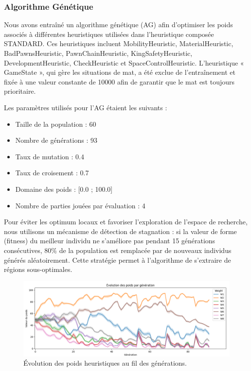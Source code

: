 \documentclass{article}
\begin{document}
\subsubsection{Algorithme Génétique}

Nous avons entraîné un algorithme génétique (AG) afin d'optimiser les poids associés à différentes heuristiques utilisées dans l'heuristique composée STANDARD. Ces heuristiques incluent MobilityHeuristic, MaterialHeuristic, BadPawnsHeuristic, PawnChainHeuristic, KingSafetyHeuristic, DevelopmentHeuristic, CheckHeuristic et SpaceControlHeuristic. L'heuristique « GameState », qui gère les situations de mat, a été exclue de l'entraînement et fixée à une valeur constante de 10000 afin de garantir que le mat est toujours prioritaire.

Les paramètres utilisés pour l'AG étaient les suivants :
\begin{itemize}
  \item Taille de la population : 60
  \item Nombre de générations : 93
  \item Taux de mutation : 0.4
  \item Taux de croisement : 0.7
  \item Domaine des poids : [0.0 ; 100.0]
  \item Nombre de parties jouées par évaluation : 4
\end{itemize}

Pour éviter les optimum locaux et favoriser l'exploration de l'espace de recherche, nous utilisons un mécanisme de détection de stagnation : si la valeur de forme (fitness) du meilleur individu ne s'améliore pas pendant 15 générations consécutives, 80\% de la population est remplacée par de nouveaux individus générés aléatoirement. Cette stratégie permet à l'algorithme de s'extraire de régions sous-optimales.

\begin{figure}[H]
  \centering
  \includegraphics[width=\textwidth]{AG_weights.png}
  \caption{Évolution des poids heuristiques au fil des générations.}
  \label{fig:evolution_weights}
\end{figure}
\end{document}

